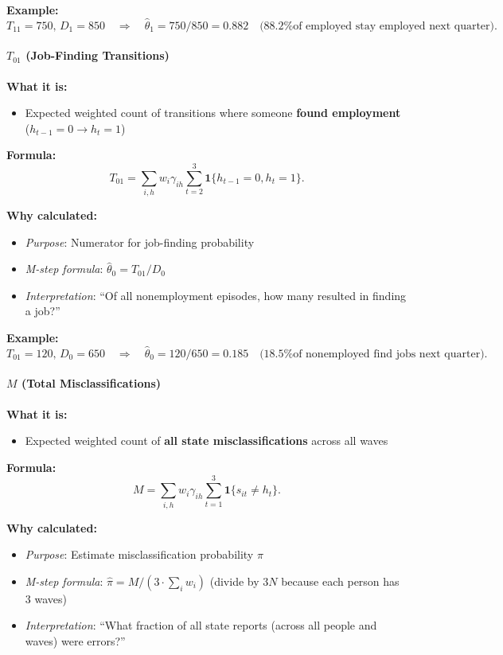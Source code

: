 \documentclass[12pt]{article}
\begin{document}
\textbf{Example:}
\[
T_{11} = 750,\, D_1 = 850 \quad\Rightarrow\quad \hat{\theta}_1 = 750/850 = 0.882 \quad\text{(88.2\% of employed stay employed next quarter)}.
\]

\paragraph{$T_{01}$ (Job-Finding Transitions)}

\textbf{What it is:}
\begin{itemize}
\item Expected weighted count of transitions where someone \textbf{found employment} ($h_{t-1} = 0 \to h_t = 1$)
\end{itemize}

\textbf{Formula:}
\[
T_{01} = \sum_{i,h} w_i\gamma_{ih}\sum_{t=2}^3\mathbf{1}\{h_{t-1}=0, h_t=1\}.
\]

\textbf{Why calculated:}
\begin{itemize}
\item \emph{Purpose}: Numerator for job-finding probability
\item \emph{M-step formula}: $\hat{\theta}_0 = T_{01} / D_0$
\item \emph{Interpretation}: ``Of all nonemployment episodes, how many resulted in finding a job?''
\end{itemize}

\textbf{Example:}
\[
T_{01} = 120,\, D_0 = 650 \quad\Rightarrow\quad \hat{\theta}_0 = 120/650 = 0.185 \quad\text{(18.5\% of nonemployed find jobs next quarter)}.
\]

\paragraph{$M$ (Total Misclassifications)}

\textbf{What it is:}
\begin{itemize}
\item Expected weighted count of \textbf{all state misclassifications} across all waves
\end{itemize}

\textbf{Formula:}
\[
M = \sum_{i,h} w_i\gamma_{ih}\sum_{t=1}^3 \mathbf{1}\{s_{it} \neq h_t\}.
\]

\textbf{Why calculated:}
\begin{itemize}
\item \emph{Purpose}: Estimate misclassification probability $\pi$
\item \emph{M-step formula}: $\hat{\pi} = M / (3\cdot\sum_i w_i)$ (divide by $3N$ because each person has 3 waves)
\item \emph{Interpretation}: ``What fraction of all state reports (across all people and waves) were errors?''
\end{itemize}
\end{document}

